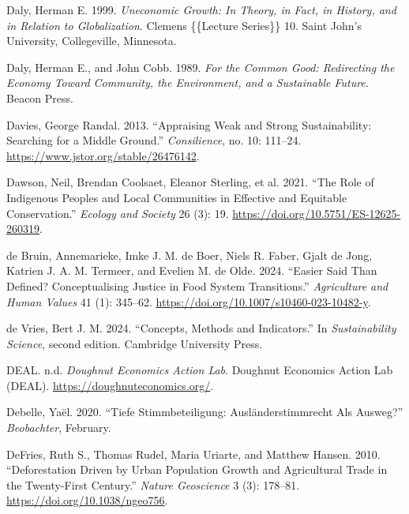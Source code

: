 \documentclass[
  a4paper,
  DIV=11,
  numbers=noendperiod,
  oneside,
  openany]{scrreprt}
\newlength{\cslhangindent}
\newenvironment{CSLReferences}[2] %
 {\begin{list}{}{%
  \setlength{\itemindent}{0pt}
  \setlength{\leftmargin}{0pt}
  \setlength{\parsep}{0pt}
  \ifodd #1
   \setlength{\leftmargin}{\cslhangindent}
   \setlength{\itemindent}{-1\cslhangindent}
  \fi
  \setlength{\itemsep}{#2\baselineskip}}}
 {\end{list}}
\begin{document}
\begin{CSLReferences}{1}{1}
Daly, Herman E. 1999. \emph{Uneconomic {Growth}: {In Theory}, in {Fact},
in {History}, and in {Relation} to {Globalization}}. Clemens \{\{Lecture
Series\}\} 10. Saint John's University, Collegeville, Minnesota.

Daly, Herman E., and John Cobb. 1989. \emph{For the {Common} {Good}:
{Redirecting} the {Economy} {Toward} {Community}, the {Environment}, and
a Sustainable {Future}}. Beacon Press.

Davies, George Randal. 2013. {``Appraising {Weak} and {Strong
Sustainability}: {Searching} for a {Middle Ground}.''}
\emph{Consilience}, no. 10: 111--24.
\url{https://www.jstor.org/stable/26476142}.

Dawson, Neil, Brendan Coolsaet, Eleanor Sterling, et al. 2021. {``The
Role of {Indigenous} Peoples and Local Communities in Effective and
Equitable Conservation.''} \emph{Ecology and Society} 26 (3): 19.
\url{https://doi.org/10.5751/ES-12625-260319}.

{de Bruin, Annemarieke, Imke J. M. de Boer, Niels R. Faber, Gjalt de
Jong, Katrien J. A. M. Termeer, and Evelien M. de Olde}. 2024. {``Easier
Said Than Defined? {Conceptualising} Justice in Food System
Transitions.''} \emph{Agriculture and Human Values} 41 (1): 345--62.
\url{https://doi.org/10.1007/s10460-023-10482-y}.

{de Vries, Bert J. M.} 2024. {``Concepts, {Methods} and {Indicators}.''}
In \emph{Sustainability {Science}}, second edition. Cambridge University
Press.

DEAL. n.d. \emph{Doughnut {Economics} {Action} {Lab}}. Doughnut
Economics Action Lab (DEAL). \url{https://doughnuteconomics.org/}.

Debelle, Yaël. 2020. {``{Tiefe Stimmbeteiligung: Ausl{ä}nderstimmrecht
Als Ausweg?}''} \emph{Beobachter}, February.

DeFries, Ruth S., Thomas Rudel, Maria Uriarte, and Matthew Hansen. 2010.
{``Deforestation Driven by Urban Population Growth and Agricultural
Trade in the Twenty-First Century.''} \emph{Nature Geoscience} 3 (3):
178--81. \url{https://doi.org/10.1038/ngeo756}.


\end{CSLReferences}
\end{document}
